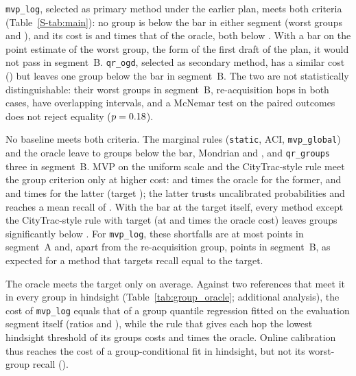 \texttt{mvp\_log}, selected as primary method under the earlier plan, meets both criteria
(Table~\ref{S-tab:main}): no group is below the bar in either segment (worst groups
\heldMvpLogWorstA{} and \heldMvpLogWorstB), and its cost is \heldMvpLogCostRatioA{}
and \heldMvpLogCostRatioB{} times that of the oracle, both below \costFactor. With a bar on the point
estimate of the worst group, the form of the first draft of the plan, it would not
pass in segment~B. \texttt{qr\_ogd}, selected as secondary method, has a similar cost
(\heldQrOgdCostRatioMean) but leaves one group below the bar in segment~B. The two
are not statistically distinguishable: their worst groups in segment~B,
re-acquisition hops in both cases, have overlapping intervals, and a McNemar test
on the paired outcomes does not reject equality ($p=0.18$).

No baseline meets both criteria. The marginal rules (\texttt{static}, ACI,
\texttt{mvp\_global}) and the oracle leave \heldMarginalBelowBarMin{} to
\heldMarginalBelowBarMax{} groups below the bar, Mondrian
\heldMondrianBelowBarA{} and \heldMondrianBelowBarB, and \texttt{qr\_groups} three
in segment~B. MVP on the uniform scale and the CityTrac-style rule meet the group
criterion only at higher cost: \heldMvpGroupsCostRatioA{} and
\heldMvpGroupsCostRatioB{} times the oracle for the former, and
\heldCityTracNinetyFiveCostRatioA{} and \heldCityTracNinetyFiveCostRatioB{} times
for the latter (target \citytracTargetLow); the latter trusts uncalibrated
probabilities and reaches a mean recall of \heldCityTracNinetyFiveRecallApprox.
With the bar at the target itself, every method except the CityTrac-style rule
with target \citytracTargetHigh{} (at \heldCityTracNinetyNineCostRatioA{} and
\heldCityTracNinetyNineCostRatioB{} times the oracle cost) leaves groups
significantly below \targetRecall. For \texttt{mvp\_log}, these shortfalls are at
most \heldMvpLogMaxShortfallPpA{} points in segment~A and, apart from the
re-acquisition group, \heldMvpLogMaxShortfallPpExReacqB{} points in segment~B, as
expected for a method that targets recall equal to the target.

The oracle meets the target only on average. Against two references that meet it
in every group in hindsight (Table~\ref{tab:group_oracle}; additional analysis),
the cost of \texttt{mvp\_log} equals that of a group quantile regression fitted on
the evaluation segment itself (ratios \goMvpLogOverQrA{} and \goMvpLogOverQrB),
while the rule that gives each hop the lowest hindsight threshold of its groups
costs \goGroupMinCostRatioA{} and \goGroupMinCostRatioB{} times the oracle. Online calibration thus reaches the
cost of a group-conditional fit in hindsight, but not its worst-group recall
(\goQrWorst).

